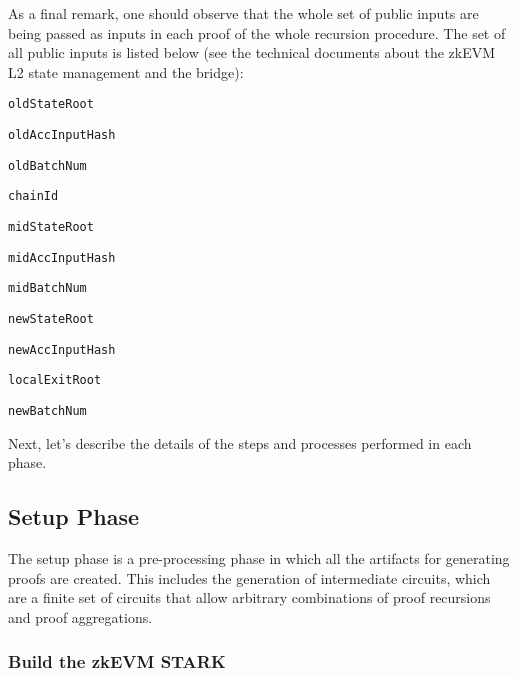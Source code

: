 As a final remark, one should observe that the whole set of public inputs are being passed as inputs in each proof of the whole recursion procedure. The set of all public inputs is listed below (see the technical documents about the zkEVM L2 state management and the bridge):

\vspace{0.15cm}
\begin{compactitem}

\item \texttt{oldStateRoot}

\item \texttt{oldAccInputHash}

\item \texttt{oldBatchNum}

\item \texttt{chainId}

\item \texttt{midStateRoot}

\item \texttt{midAccInputHash}

\item \texttt{midBatchNum}

\item \texttt{newStateRoot}

\item \texttt{newAccInputHash}

\item \texttt{localExitRoot}

\item \texttt{newBatchNum}
\end{compactitem}

Next, let's describe the details of the steps and processes performed in each phase.

\subsection{Setup Phase}

The setup phase is a pre-processing phase in which all the artifacts for generating proofs are created. This includes the generation of intermediate circuits, which 
are a finite set of circuits that allow arbitrary combinations of proof recursions and proof aggregations.


\subsubsection{Build the zkEVM STARK}

